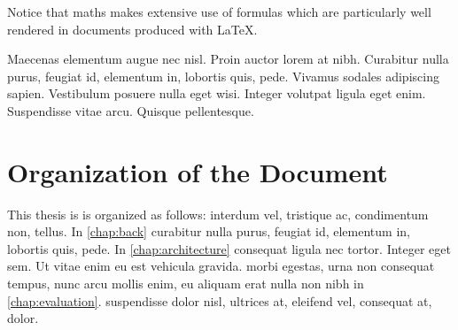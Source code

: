 Notice that \gls{maths} makes extensive use of \Glspl{formula} which are particularly well rendered in documents produced with \gls{LaTeX}.

Maecenas elementum augue nec nisl. Proin auctor lorem at nibh. Curabitur nulla purus, feugiat id, elementum in, lobortis quis, pede. Vivamus sodales adipiscing sapien. Vestibulum posuere nulla eget wisi. Integer volutpat ligula eget enim. Suspendisse vitae arcu. Quisque pellentesque.
\section{Organization of the Document}
This thesis is is organized as follows:  interdum vel, tristique ac, condimentum non, tellus.
In \cref{chap:back} curabitur nulla purus, feugiat id, elementum in, lobortis quis, pede.
In \cref{chap:architecture} consequat ligula nec tortor. Integer eget sem. Ut vitae enim eu est vehicula gravida.
 morbi egestas, urna non consequat tempus, nunc arcu mollis enim, eu aliquam erat nulla non nibh in \cref{chap:evaluation}.
 suspendisse dolor nisl, ultrices at, eleifend vel, consequat at, dolor.
